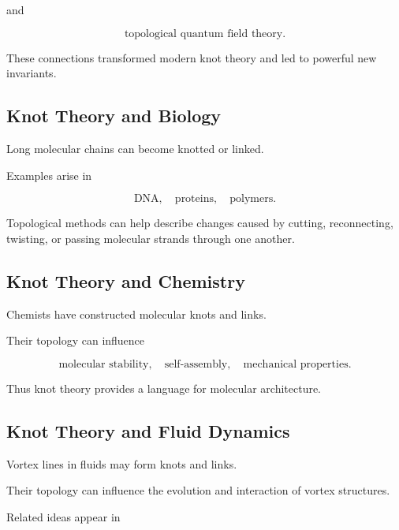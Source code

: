 and

\[
\boxed{
\text{topological quantum field theory}.
}
\]

These connections transformed modern knot theory and led to powerful new
invariants.

\subsection{Knot Theory and Biology}
\label{subsec:knot-theory-biology}

Long molecular chains can become knotted or linked.

Examples arise in

\[
\boxed{
\text{DNA},
\quad
\text{proteins},
\quad
\text{polymers}.
}
\]

Topological methods can help describe changes caused by cutting,
reconnecting, twisting, or passing molecular strands through one another.

\subsection{Knot Theory and Chemistry}
\label{subsec:knot-theory-chemistry}

Chemists have constructed molecular knots and links.

Their topology can influence

\[
\boxed{
\text{molecular stability},
\quad
\text{self-assembly},
\quad
\text{mechanical properties}.
}
\]

Thus knot theory provides a language for molecular architecture.

\subsection{Knot Theory and Fluid Dynamics}
\label{subsec:knot-theory-fluid-dynamics}

Vortex lines in fluids may form knots and links.

Their topology can influence the evolution and interaction of vortex
structures.

Related ideas appear in


